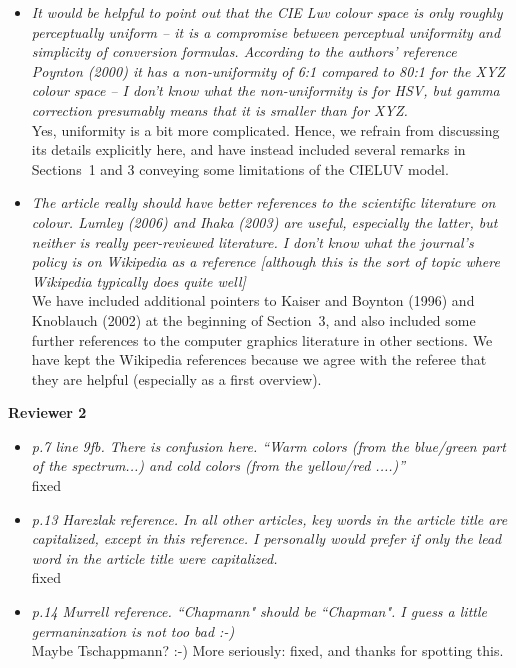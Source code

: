 \documentclass{wuletter}
\begin{document}
\begin{itemize}
  \item \textit{It would be helpful to point out that the CIE Luv colour
        space is only roughly perceptually uniform -- it is a compromise
	between perceptual uniformity and simplicity of conversion formulas.
	According to the authors' reference Poynton (2000) it has a non-uniformity
	of 6:1 compared to 80:1 for the XYZ colour space -- I don't know what the
	non-uniformity is for HSV, but gamma correction presumably means that it
	is smaller than for XYZ.}\\[-0.3cm]

        Yes, uniformity is a bit more complicated. Hence, we refrain from 
	discussing its details explicitly here, and have instead included several
	remarks in Sections~1 and 3 conveying some limitations of the CIELUV model.
	
  \item \textit{The article really should have better references to the scientific
        literature on colour. Lumley (2006) and Ihaka (2003) are useful, especially
        the latter, but neither is really peer-reviewed literature.  I don't know
        what the journal's policy is on Wikipedia as a reference [although this is
        the sort of topic where Wikipedia typically does quite well]}\\[-0.3cm]
	
	We have included additional pointers to Kaiser and Boynton (1996) and Knoblauch (2002)
	at the beginning of Section~3, and also included some further references
	to the computer graphics literature in other sections. We have kept the
	Wikipedia references because we agree with the referee that they are
	helpful (especially as a first overview).
\end{itemize}


\textbf{Reviewer 2}

\begin{itemize}
  \item \textit{p.7 line 9fb. There is confusion here. ``Warm colors
        (from the blue/green part of the spectrum...) and cold colors
	(from the yellow/red ....)''}\\[-0.3cm]
	
	fixed
	
  \item \textit{p.13 Harezlak reference. In all other articles, key words in the article
        title are capitalized, except in this reference. I personally would prefer
        if only the lead word in the article title were capitalized.}\\[-0.3cm]
	
	fixed
	
  \item \textit{p.14 Murrell reference. ``Chapmann" should be ``Chapman". I guess a little
        germaninzation is not too bad :-)}\\[-0.3cm]
	
	Maybe Tschappmann? :-) More seriously: fixed, and thanks for spotting this.
\end{itemize}
\end{document}
